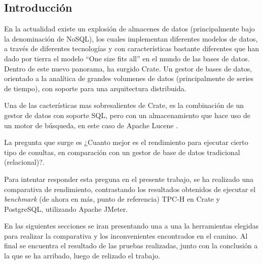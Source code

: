 \documentclass[11pt, twocolumns]{article}
\begin{document}
\begin{multicols}{2}


\section{Introducción}
En la actualidad existe un explosión de almacenes de datos (principalmente bajo la denominación de NoSQL), los cuales implementan diferentes modelos de datos, a través de diferentes tecnologías y con características bastante diferentes que han dado por tierra el modelo ``One size fits all'' en el mundo de las bases de datos. Dentro de este nuevo panorama, ha surgido Crate. Un gestor de bases de datos, orientado a la analítica de grandes volumenes de datos (principalmente de series de tiempo), con soporte para una arquitectura distribuida.
\par
Una de las cacterísticas mas sobresalientes de Crate, es la combinación de un gestor de datos con soporte SQL, pero con un almacenamiento que hace uso de un motor de búsqueda, en este caso de Apache Lucene \cite{crate}.
\par
La pregunta que surge es ¿Cuanto mejor es el rendimiento para ejecutar cierto tipo de conultas, en comparación con un gestor de base de datos tradicional (relacional)?.
\par
Para intentar responder esta preguna en el presente trabajo, se ha realizado una comparativa de rendimiento, contrastando los resultados obtenidos de ejecutar el \textit{benchmark} (de ahora en más, punto de referencia) TPC-H en Crate y PostgreSQL, utilizando Apache JMeter.
\par
En las siguientes secciones se iran presentando una a una la herramientas elegidas para realizar la comparativa y los inconvenientes encontrados en el camino. Al final se encuentra el resultado de las pruebas realizadas, junto con la conclusión a la que se ha arribado, luego de relizado el trabajo.



\end{multicols}
\end{document}
